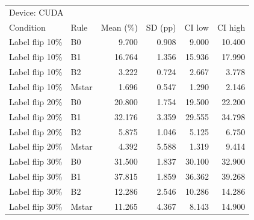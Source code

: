 \begin{tabular}{llrrrr}
\toprule
\multicolumn{6}{l}{Device: CUDA} \\
Condition & Rule & Mean (\%) & SD (pp) & CI low & CI high \\
\midrule
Label flip 10\% & B0 & 9.700 & 0.908 & 9.000 & 10.400 \\
Label flip 10\% & B1 & 16.764 & 1.356 & 15.936 & 17.990 \\
Label flip 10\% & B2 & 3.222 & 0.724 & 2.667 & 3.778 \\
Label flip 10\% & Mstar & 1.696 & 0.547 & 1.290 & 2.146 \\
Label flip 20\% & B0 & 20.800 & 1.754 & 19.500 & 22.200 \\
Label flip 20\% & B1 & 32.176 & 3.359 & 29.555 & 34.798 \\
Label flip 20\% & B2 & 5.875 & 1.046 & 5.125 & 6.750 \\
Label flip 20\% & Mstar & 4.392 & 5.588 & 1.319 & 9.414 \\
Label flip 30\% & B0 & 31.500 & 1.837 & 30.100 & 32.900 \\
Label flip 30\% & B1 & 37.815 & 1.859 & 36.362 & 39.268 \\
Label flip 30\% & B2 & 12.286 & 2.546 & 10.286 & 14.286 \\
Label flip 30\% & Mstar & 11.265 & 4.367 & 8.143 & 14.900 \\
\bottomrule
\end{tabular}
